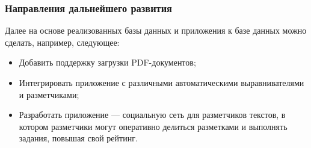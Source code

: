 \documentclass{beamer}
\begin{document}
\begin{frame}
    \frametitle{Направления дальнейшего развития}
    Далее на основе реализованных базы данных и приложения к базе данных можно сделать, например, следующее:
    \begin{itemize}
        \item Добавить поддержку загрузки PDF-документов;
        \item Интегрировать приложение с различными автоматическими выравнивателями и разметчиками;
        \item Разработать приложение --- социальную сеть для разметчиков текстов, в котором разметчики могут оперативно делиться разметками и выполнять задания, повышая свой рейтинг.
    \end{itemize}
\end{frame}
\end{document}
